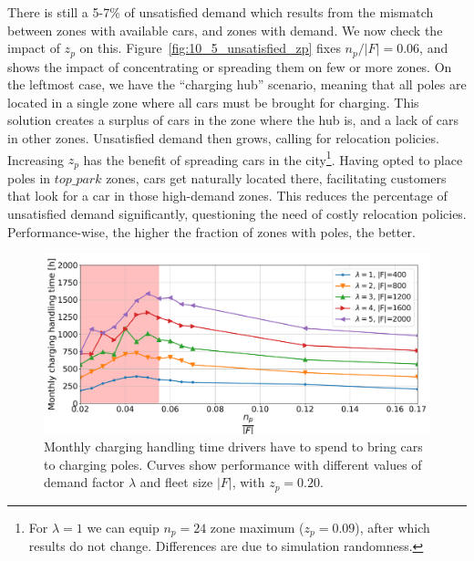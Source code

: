 There is still a 5-7\% of unsatisfied demand which results from the mismatch between zones with available cars, and zones with demand. We now check the impact of $z_p$ on this.
Figure~\ref{fig:10_5_unsatisfied_zp} fixes $n_p/|F|=0.06$, and shows the impact of concentrating or spreading them on few or more zones. On the leftmost case, we have the ``charging hub'' scenario, meaning that all poles are located in a single zone where all cars must be brought for charging. This solution creates a surplus of cars in the zone where the hub is, and a lack of cars in other zones. Unsatisfied demand then grows, calling for relocation policies.
Increasing $z_p$ has the benefit of spreading cars in the city\footnote{For $\lambda=1$ we can equip $n_p=24$ zone maximum ($z_p=0.09$), after which results do not change. Differences are due to simulation randomness.}. Having opted to place poles in $top\_{park}$ zones, cars get naturally located there, facilitating customers that look for a car in those high-demand zones. This reduces the percentage of unsatisfied demand significantly, questioning the need of costly relocation policies. Performance-wise, the higher the fraction of zones with poles, the better.



\begin{figure}
\centering
\includegraphics[width=1.\linewidth]{fig/final/relocost_zp-20.pdf}
\caption{Monthly charging handling time drivers have to spend to bring cars to charging poles. Curves show performance with different values of demand factor $\lambda$ and fleet size $|F|$, with $z_p=0.20$.}
\label{fig:10_5_zp_relocost}
\end{figure}

